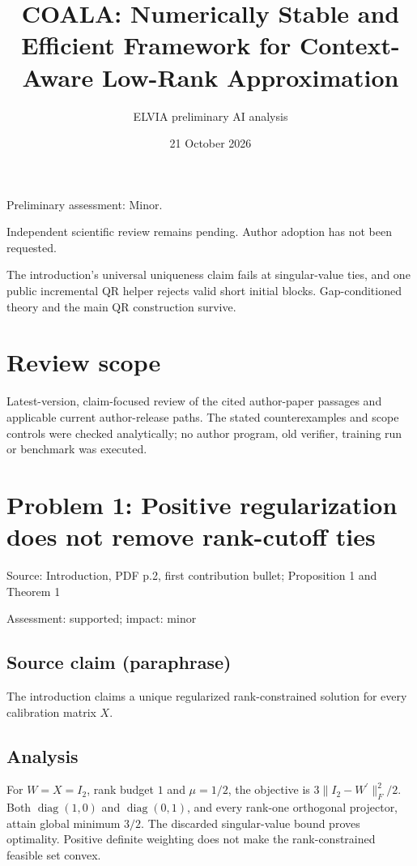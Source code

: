 \documentclass[11pt]{article}
\begin{document}
\title{COALA: Numerically Stable and Efficient Framework for Context-Aware Low-Rank Approximation}

\author{ELVIA preliminary AI analysis}\date{21 October 2026}\maketitle

Preliminary assessment: Minor.\par

Independent scientific review remains pending. Author adoption has not been requested.

The introduction’s universal uniqueness claim fails at singular-value ties, and one public incremental QR helper rejects valid short initial blocks. Gap-conditioned theory and the main QR construction survive.

\section*{Review scope}

Latest-version, claim-focused review of the cited author-paper passages and applicable current author-release paths. The stated counterexamples and scope controls were checked analytically; no author program, old verifier, training run or benchmark was executed.

\section*{Problem 1: Positive regularization does not remove rank-cutoff ties}

Source: Introduction, PDF p.2, first contribution bullet; Proposition 1 and Theorem 1

Assessment: supported; impact: minor

\subsection*{Source claim (paraphrase)}

The introduction claims a unique regularized rank-constrained solution for every calibration matrix \(X\).

\subsection*{Analysis}

For \(W=X=I_2\), rank budget \(1\) and \(\mu=1/2\), the objective is \(3\|I_2-W^\prime\|_F^2/2\). Both \(\operatorname{diag}(1,0)\) and \(\operatorname{diag}(0,1)\), and every rank-one orthogonal projector, attain global minimum \(3/2\). The discarded singular-value bound proves optimality. Positive definite weighting does not make the rank-constrained feasible set convex.
\end{document}
